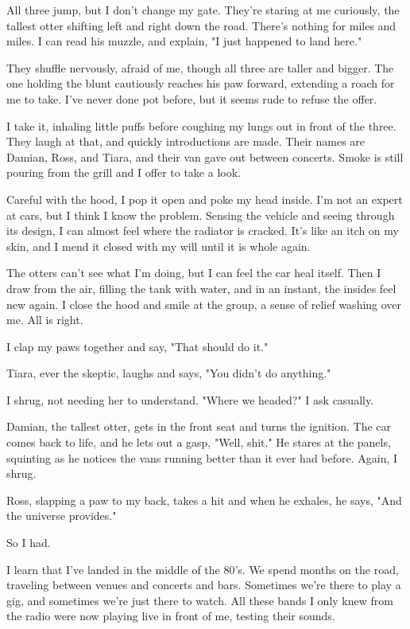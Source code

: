 All three jump, but I don't change my gate. They're staring at me curiously, the tallest otter shifting left and right down the road. There's nothing for miles and miles. I can read his muzzle, and explain, "I just happened to land here."

They shuffle nervously, afraid of me, though all three are taller and bigger. The one holding the blunt cautiously reaches his paw forward, extending a roach for me to take. I've never done pot before, but it seems rude to refuse the offer.

I take it, inhaling little puffs before coughing my lungs out in front of the three. They laugh at that, and quickly introductions are made. Their names are Damian, Ross, and Tiara, and their van gave out between concerts. Smoke is still pouring from the grill and I offer to take a look.

Careful with the hood, I pop it open and poke my head inside. I'm not an expert at cars, but I think I know the problem. Sensing the vehicle and seeing through its design, I can almost feel where the radiator is cracked. It's like an itch on my skin, and I mend it closed with my will until it is whole again.

The otters can't see what I'm doing, but I can feel the car heal itself. Then I draw from the air, filling the tank with water, and in an instant, the insides feel new again. I close the hood and smile at the group, a sense of relief washing over me. All is right.

I clap my paws together and say, "That should do it."

Tiara, ever the skeptic, laughs and says, "You didn't do anything."

I shrug, not needing her to understand. "Where we headed?" I ask casually.

Damian, the tallest otter, gets in the front seat and turns the ignition. The car comes back to life, and he lets out a gasp, "Well, shit." He stares at the panels, squinting as he notices the vans running better than it ever had before. Again, I shrug.

Ross, slapping a paw to my back, takes a hit and when he exhales, he says, "And the universe provides."

So I had.

I learn that I've landed in the middle of the 80's. We spend months on the road, traveling between venues and concerts and bars. Sometimes we're there to play a gig, and sometimes we're just there to watch. All these bands I only knew from the radio were now playing live in front of me, testing their sounds.

